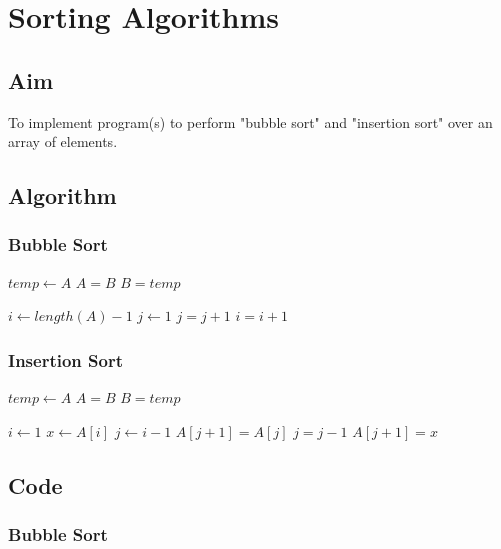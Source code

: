\chapter{Sorting Algorithms}

\section{Aim}

To implement program(s) to perform "bubble sort" and "insertion sort" over an array of elements.

\section{Algorithm}

\subsection{Bubble Sort}
\begin{algorithmic}
		\State $temp \gets A$
		\State $A = B$
		\State $B = temp$
	\EndFunction

		\State $i \gets length(A) - 1$
			\State $j \gets 1$
					\State {}
				\EndIf
				\State $j = j + 1$
			\EndWhile
			\State $i = i + 1$
		\EndWhile
	\EndFunction
\end{algorithmic}


\subsection{Insertion Sort}
\begin{algorithmic}
		\State $temp \gets A$
		\State $A = B$
		\State $B = temp$
	\EndFunction

		\State $i \gets 1$
			\State $x \gets A[i]$
			\State $j \gets i-1$
				\State $A[j+1] = A[j]$
				\State $j = j - 1$
			\EndWhile
			\State $A[j+1] = x$
		\EndWhile
	\EndFunction
\end{algorithmic}

\section{Code}

\subsection{Bubble Sort}

